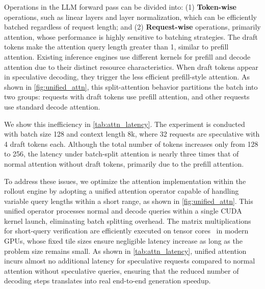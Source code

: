 Operations in the LLM forward pass can be divided into: (1) \textbf{Token-wise} operations, such as linear layers and layer normalization, which can be efficiently batched regardless of request length; and (2) \textbf{Request-wise} operations, primarily attention, whose performance is highly sensitive to batching strategies. 
The draft tokens make the attention query length greater than 1, similar to prefill attention. Existing inference engines use different kernels for prefill and decode attention due to their distinct resource characteristics. 
When draft tokens appear in speculative decoding, they trigger the less efficient prefill-style attention. As shown in \autoref{fig:unified_attn}, this split-attention behavior partitions the batch into two groups: requests with draft tokens use prefill attention, and other requests use standard decode attention.

We show this inefficiency in \autoref{tab:attn_latency}. The experiment is conducted with batch size 128 and context length 8k, where 32 requests are speculative with 4 draft tokens each. 
Although the total number of tokens increases only from 128 to 256, the latency under batch-split attention is nearly three times that of normal attention without draft tokens, primarily due to the prefill attention. 

To address these issues, we optimize the attention implementation within the rollout engine by adopting a unified attention operator capable of handling variable query lengths within a short range, as shown in \autoref{fig:unified_attn}. 
This unified operator processes normal and decode queries within a single CUDA kernel launch, eliminating batch splitting overhead. 
The matrix multiplications for short-query verification are efficiently executed on tensor cores~\cite{markidis2018nvidia_tensor} in modern GPUs, whose fixed tile sizes ensure negligible latency increase as long as the problem size remains small. 
As shown in \autoref{tab:attn_latency}, unified attention incurs almost no additional latency for speculative requests compared to normal attention without speculative queries, ensuring that the reduced number of decoding steps translates into real end-to-end generation speedup. 
